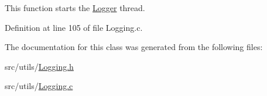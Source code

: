 This function starts the \mbox{\hyperlink{class_world_architect_1_1_logger}{Logger}} thread. 



Definition at line 105 of file Logging.\+c.



The documentation for this class was generated from the following files\+:\begin{DoxyCompactItemize}
\item 
src/utils/\mbox{\hyperlink{_logging_8h}{Logging.\+h}}\item 
src/utils/\mbox{\hyperlink{_logging_8c}{Logging.\+c}}\end{DoxyCompactItemize}
